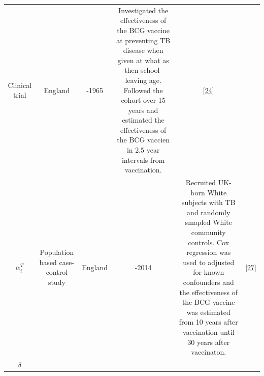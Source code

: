 \documentclass[11pt,twoside]{bristolthesis}
\begin{document}
\begin{longtable}[]{@{}cccccc@{}}
\begin{minipage}[t]{0.10\columnwidth}
  Clinical
  trial\strut
  \end{minipage} & \begin{minipage}[t]{0.07\columnwidth}\centering
  England\strut
  \end{minipage} & \begin{minipage}[t]{0.07\columnwidth}\centering
  1950-1965\strut
  \end{minipage} & \begin{minipage}[t]{0.27\columnwidth}\centering
  Investigated the effectiveness of the
  BCG vaccine at preventing TB disease
  when given at what as then
  school-leaving age. Followed the cohort
  over 15 years and estimated the
  effectiveness of the BCG vaccien in 2.5
  year intervals from vaccination.\strut
  \end{minipage} & \begin{minipage}[t]{0.11\columnwidth}\centering
  {[}\protect\hyperlink{ref-Hart1972}{24}{]}\strut
  \end{minipage}\tabularnewline
  \begin{minipage}[t]{0.21\columnwidth}\centering
  \(\alpha_i^T\)\strut
  \end{minipage} & \begin{minipage}[t]{0.10\columnwidth}\centering
  Population
  based
  case-control
  study\strut
  \end{minipage} & \begin{minipage}[t]{0.07\columnwidth}\centering
  England\strut
  \end{minipage} & \begin{minipage}[t]{0.07\columnwidth}\centering
  2002-2014\strut
  \end{minipage} & \begin{minipage}[t]{0.27\columnwidth}\centering
  Recruited UK-born White subjects with TB
  and randomly smapled White community
  controls. Cox regression was used to
  adjusted for known confounders and the
  effectiveness of the BCG vaccine was
  estimated from 10 years after
  vaccination until 30 years after
  vaccinaton.\strut
  \end{minipage} & \begin{minipage}[t]{0.11\columnwidth}\centering
  {[}\protect\hyperlink{ref-Mangtani2017}{27}{]}\strut
  \end{minipage}\tabularnewline
  \begin{minipage}[t]{0.21\columnwidth}\centering
  \(\delta\)\strut
  \end{minipage} & \begin{minipage}[t]{0.10\columnwidth}\centering

\end{minipage}
\end{longtable}
\end{document}
